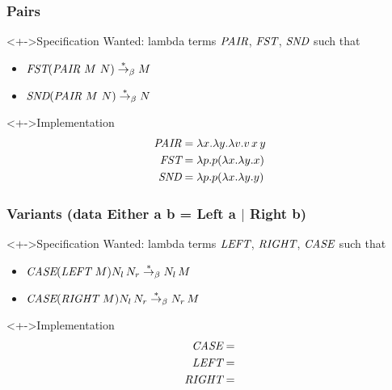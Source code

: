\documentclass[pdftex,aspectratio=169]{beamer}
\begin{document}
\begin{frame}
  \frametitle{Pairs}
  \begin{exampleblock}<+->{Specification}
    Wanted: lambda terms $\textit{PAIR}$, $\textit{FST}$, $\textit{SND}$ such that
    \begin{itemize}
    \item $\textit{FST} (\textit{PAIR}~M~N) \stackrel\ast\rightarrow_\beta M$
    \item $\textit{SND} (\textit{PAIR}~M~N) \stackrel\ast\rightarrow_\beta N$
    \end{itemize}
  \end{exampleblock}
  \begin{alertblock}<+->{Implementation}\VSPBLS
    \begin{align*}
      \textit{PAIR} &= \lambda x.\lambda y. \lambda v. v\,x\,y \\
      \textit{FST}  &= \lambda p. p (\lambda x.\lambda y. x) \\
      \textit{SND}  &= \lambda p. p (\lambda x.\lambda y. y)
    \end{align*}
  \end{alertblock}
\end{frame}

\begin{frame}
  \frametitle{Variants (data Either a b = Left a $\mid$ Right b)}
  \begin{exampleblock}<+->{Specification}
    Wanted: lambda terms $\textit{LEFT}$, $\textit{RIGHT}$, $\textit{CASE}$ such that
    \begin{itemize}
    \item $\textit{CASE} (\textit{LEFT}~M) N_l\,N_r \stackrel\ast\rightarrow_\beta N_l\,M$
    \item $\textit{CASE} (\textit{RIGHT}~M) N_l\,N_r \stackrel\ast\rightarrow_\beta N_r\,M$
    \end{itemize}
  \end{exampleblock}
  \begin{alertblock}<+->{Implementation}\VSPBLS
    \begin{align*}
      \textit{CASE} &= \\
      \textit{LEFT} &= \\
      \textit{RIGHT}&=
    \end{align*}
  \end{alertblock}
\end{frame}
\end{document}
